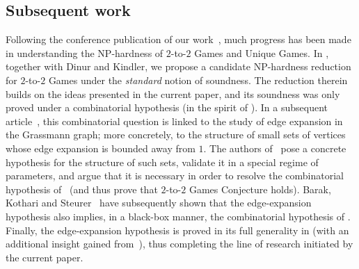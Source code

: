 \documentclass{toc}
\begin{document}
%
\subsection{Subsequent work}\label{sec:subsequent}  %
Following %
the conference publication of our work~\cite{conf-version}, %
much progress has been %
made %
in understanding the NP-hardness of $2$-to-$2$ Games and Unique Games.
In \cite{DKKMS1}, together with Dinur and Kindler, we propose a candidate NP-hardness reduction for $2$-to-$2$ Games under the
\emph{standard} notion of soundness. The reduction therein builds on the ideas presented in the current paper,
and its soundness was only proved under a combinatorial hypothesis (in the spirit of ).
%
In a subsequent article~\cite{DKKMS2},  %
this combinatorial question is linked to the study of
%
edge expansion  %
in the Grassmann graph;
more concretely, to the structure of small sets of vertices whose edge expansion is
bounded away from $1$.
The authors of~\cite{DKKMS2} pose a concrete hypothesis for the structure of such sets,
validate it in a special regime of parameters,
and argue that it is necessary in order to resolve the combinatorial hypothesis
of~\cite{DKKMS2} (and thus prove that $2$-to-$2$ Games Conjecture holds).
Barak, Kothari and Steurer~\cite{BKS} have %
subsequently  %
%
shown  %
that the edge-expansion hypothesis also implies, in a black-box manner,
the combinatorial hypothesis of \cite{DKKMS2}. Finally, the edge-expansion hypothesis
is proved in its full generality in \cite{KMS2}
(with an additional insight gained from~\cite{KMMS}), thus completing the line of
research initiated by the current paper.
\end{document}
